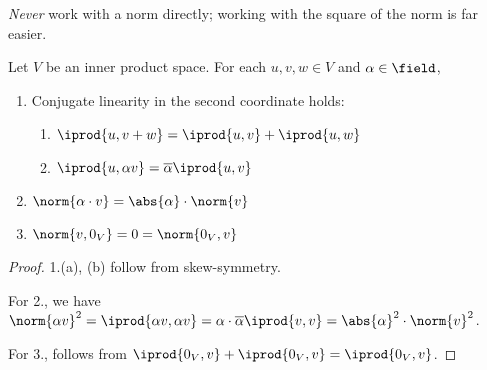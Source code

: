 \begin{remark}
    \emph{Never} work with a norm directly; working with the square of the norm is far easier.
\end{remark}

\begin{proposition}
    Let $V$ be an inner product space. For each $u, v, w \in V$ and $\alpha \in \field$,
    \begin{enumerate}
        \item Conjugate linearity in the second coordinate holds:
        \begin{enumerate}
            \item $\iprod{u, v + w} = \iprod{u, v} + \iprod{u, w}$
            \item $\iprod{u, \alpha v} = \overline{\alpha} \iprod{u, v}$
        \end{enumerate}
        \item $\norm{\alpha\cdot  v} = \abs{\alpha} \cdot \norm{v}$
        \item $\norm{v, 0_V} = 0 = \norm{0_V, v}$
    \end{enumerate}
\end{proposition}
\begin{proof}
    1.(a), (b) follow from skew-symmetry.

    For 2., we have $\norm{\alpha v}^2 = \iprod{\alpha v, \alpha v} = \alpha \cdot \overline{\alpha} \iprod{v, v} = \abs{\alpha}^2 \cdot \norm{v}^2$.

    For 3., follows from $\iprod{0_V, v} + \iprod{0_V, v} = \iprod{0_V, v}$.
\end{proof}

